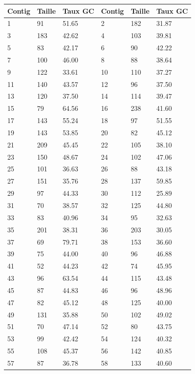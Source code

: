 \documentclass[10.9pt]{article} %
\begin{document}
\footnotesize{
\begin{longtable}{|p{2cm}|p{2cm}|p{2cm}|p{2cm}|p{2cm}|p{2cm}|}
\hline
Contig & Taille & Taux GC & Contig & Taille & Taux GC\\
\hline
1 & 91& 51.65 & 2 & 182& 31.87\\
\hline
3 & 183& 42.62 & 4 & 103& 39.81\\
\hline
5 & 83& 42.17 & 6 & 90& 42.22\\
\hline
7 & 100& 46.00 & 8 & 88& 38.64\\
\hline
9 & 122& 33.61 & 10 & 110& 37.27\\
\hline
11 & 140& 43.57 & 12 & 96& 37.50\\
\hline
13 & 120& 37.50 & 14 & 114& 39.47\\
\hline
15 & 79& 64.56 & 16 & 238& 41.60\\
\hline
17 & 143& 55.24 & 18 & 97& 51.55\\
\hline
19 & 143& 53.85 & 20 & 82& 45.12\\
\hline
21 & 209& 45.45 & 22 & 105& 38.10\\
\hline
23 & 150& 48.67 & 24 & 102& 47.06\\
\hline
25 & 101& 36.63 & 26 & 88& 43.18\\
\hline
27 & 151& 35.76 & 28 & 137& 59.85\\
\hline
29 & 97& 44.33 & 30 & 112& 25.89\\
\hline
31 & 70& 38.57 & 32 & 125& 44.80\\
\hline
33 & 83& 40.96 & 34 & 95& 32.63\\
\hline
35 & 201& 38.31 & 36 & 203& 30.05\\
\hline
37 & 69& 79.71 & 38 & 153& 36.60\\
\hline
39 & 75& 44.00 & 40 & 96& 46.88\\
\hline
41 & 52& 44.23 & 42 & 74& 45.95\\
\hline
43 & 96& 63.54 & 44 & 115& 43.48\\
\hline
45 & 87& 44.83 & 46 & 96& 48.96\\
\hline
47 & 82& 45.12 & 48 & 125& 40.00\\
\hline
49 & 131& 35.88 & 50 & 102& 49.02\\
\hline
51 & 70& 47.14 & 52 & 80& 43.75\\
\hline
53 & 99& 42.42 & 54 & 124& 40.32\\
\hline
55 & 108& 45.37 & 56 & 142& 40.85\\
\hline
57 & 87& 36.78 & 58 & 133& 40.60\\
\hline

\end{longtable}}
\end{document}
